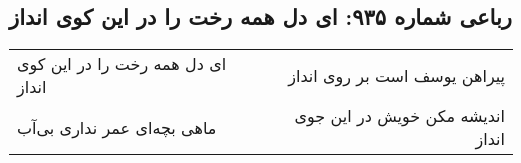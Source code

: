 \begin{center}
\section*{رباعی شماره ۹۳۵: ای دل همه رخت را در این کوی انداز}
\label{sec:0935}
\begin{longtable}{l p{0.5cm} r}
ای دل همه رخت را در این کوی انداز
&&
پیراهن یوسف است بر روی انداز
\\
ماهی بچه‌ای عمر نداری بی‌آب
&&
اندیشه مکن خویش در این جوی انداز
\\
\end{longtable}
\end{center}
